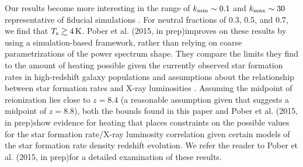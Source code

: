\documentclass[twocolumn,numberedappendix]{emulateapj} \shorttitle{New Limits on the 21 cm Power Spectrum at $z=8.4$}
\newcommand{\Tspin}{T_{\rm s}}
\newcommand{\kmin}{k_{\rm min}}
\newcommand{\kmax}{k_{\rm max}}
\newcommand{\pobercitet}{Pober et al. (2015, in prep)}
\begin{document}
Our results become more interesting in the range of $\kmin\sim0.1$ and
$\kmax\sim30$ representative of fiducial simulations
\citep{zahn_et_al2007,lidz_et_al2008}.  For neutral fractions of 0.3, 0.5, and
0.7, we find that $\Tspin\gtrsim 4\,\text{K}$. \pobercitet improves
on these results by using a simulation-based framework, rather than relying on
coarse parametrizations of the power spectrum shape.
They compare the limits they find 
to the amount of heating possible given the currently observed star
formation rates in high-redshift galaxy populations
\citep{bouwens_et_al2014,mcleod_et_al2014} and assumptions about the
relationship between star formation rates and X-ray luminosities
\citep{furlanetto_et_al2006,pritchard_loeb2008,fialkov_et_al2014}.
Assuming the
midpoint of reionization lies close to $z=8.4$ (a reasonable assumption given
that \citealt{planck_et_al2015} suggests a midpoint of $z=8.8$), both the bounds
found in this paper and \pobercitet show evidence for 
heating that places constraints on the possible values for the star formation
rate/X-ray luminosity correlation given certain models of the star formation
rate density redshift evolution. We refer the reader
to \pobercitet for a detailed examination of these results.




%

%
%
%
%
%
%
%
%
%
%
\end{document}
